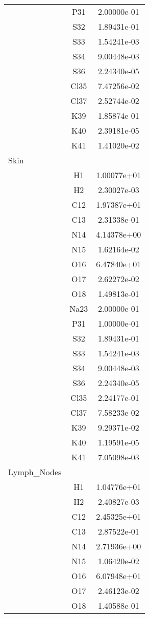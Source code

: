 \begin{centering}
\begin{longtable}{l c c}
& P31 & 2.00000e-01 \\ 
& S32 & 1.89431e-01 \\ 
& S33 & 1.54241e-03 \\ 
& S34 & 9.00448e-03 \\ 
& S36 & 2.24340e-05 \\ 
& Cl35 & 7.47256e-02 \\ 
& Cl37 & 2.52744e-02 \\ 
& K39 & 1.85874e-01 \\ 
& K40 & 2.39181e-05 \\ 
& K41 & 1.41020e-02 \\ 
\hline
Skin & & \\
\hline
& H1 & 1.00077e+01 \\ 
& H2 & 2.30027e-03 \\ 
& C12 & 1.97387e+01 \\ 
& C13 & 2.31338e-01 \\ 
& N14 & 4.14378e+00 \\ 
& N15 & 1.62164e-02 \\ 
& O16 & 6.47840e+01 \\ 
& O17 & 2.62272e-02 \\ 
& O18 & 1.49813e-01 \\ 
& Na23 & 2.00000e-01 \\ 
& P31 & 1.00000e-01 \\ 
& S32 & 1.89431e-01 \\ 
& S33 & 1.54241e-03 \\ 
& S34 & 9.00448e-03 \\ 
& S36 & 2.24340e-05 \\ 
& Cl35 & 2.24177e-01 \\ 
& Cl37 & 7.58233e-02 \\ 
& K39 & 9.29371e-02 \\ 
& K40 & 1.19591e-05 \\ 
& K41 & 7.05098e-03 \\ 
\hline
Lymph_Nodes & & \\
\hline
& H1 & 1.04776e+01 \\ 
& H2 & 2.40827e-03 \\ 
& C12 & 2.45325e+01 \\ 
& C13 & 2.87522e-01 \\ 
& N14 & 2.71936e+00 \\ 
& N15 & 1.06420e-02 \\ 
& O16 & 6.07948e+01 \\ 
& O17 & 2.46123e-02 \\ 
& O18 & 1.40588e-01 \\ 

\end{longtable}
\end{centering}
